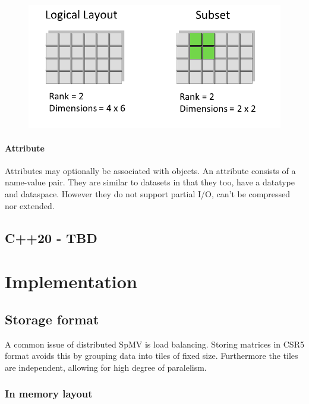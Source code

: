 \documentclass[thesis=M,english]{FITthesis}[2019/12/23]
\begin{document}
\begin{figure}[H]
    \centering
    \includegraphics[scale=0.3]{static/dataspace.png}
\end{figure}



\subsubsection{Attribute}

Attributes may optionally be associated with objects. An attribute consists of a name-value pair.
They are similar to datasets in that they too, have a datatype and dataspace. However they do not
support partial I/O, can't be compressed nor extended.





\section{C++20 - TBD}


\chapter{Implementation}

\section{Storage format}

A common issue of distributed SpMV is load balancing. Storing matrices in CSR5 format avoids this by
grouping data into tiles of fixed size. Furthermore the tiles are independent, allowing for high
degree of paralelism.

\subsection{In memory layout}
\end{document}

